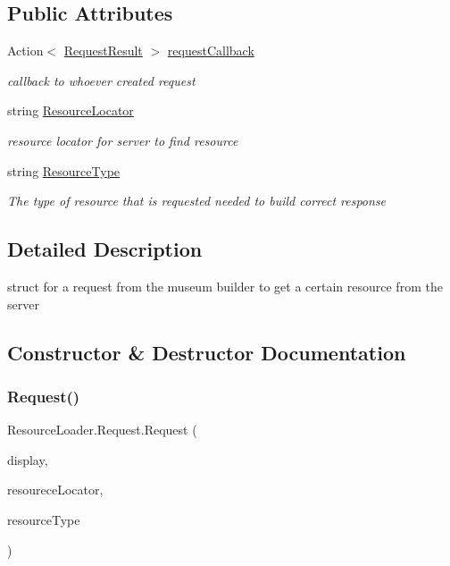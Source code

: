 \subsection*{Public Attributes}
\begin{DoxyCompactItemize}
\item 
Action$<$ \mbox{\hyperlink{struct_resource_loader_1_1_request_result}{Request\+Result}} $>$ \mbox{\hyperlink{struct_resource_loader_1_1_request_a9181d63264ecb18ff27bfd27eb1eeaf6}{request\+Callback}}
\begin{DoxyCompactList}\small\item\em callback to whoever created request \end{DoxyCompactList}\item 
string \mbox{\hyperlink{struct_resource_loader_1_1_request_aa5c217683710db8ab1f700365acb8d19}{Resource\+Locator}}
\begin{DoxyCompactList}\small\item\em resource locator for server to find resource \end{DoxyCompactList}\item 
string \mbox{\hyperlink{struct_resource_loader_1_1_request_a349cfa36f1c8a461d5475f073a5afccb}{Resource\+Type}}
\begin{DoxyCompactList}\small\item\em The type of resource that is requested needed to build correct response \end{DoxyCompactList}\end{DoxyCompactItemize}


\subsection{Detailed Description}
struct for a request from the museum builder to get a certain resource from the server 



\subsection{Constructor \& Destructor Documentation}
\mbox{\label{struct_resource_loader_1_1_request_a0eed476349c6e00847f857b251696bb5}} 
\subsubsection{\texorpdfstring{Request()}{Request()}}
{\footnotesize\ttfamily Resource\+Loader.\+Request.\+Request (\begin{DoxyParamCaption}\item[{Action$<$ \mbox{\hyperlink{struct_resource_loader_1_1_request_result}{Request\+Result}} $>$}]{display,  }\item[{string}]{resourece\+Locator,  }\item[{string}]{resource\+Type }\end{DoxyParamCaption})}



